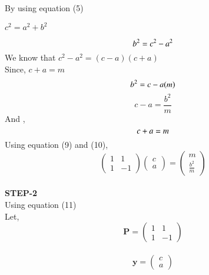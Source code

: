 \documentclass[10pt,a4paper]{report}
\let\vec\mathbf
\begin{document}
\begin{multicols}{2}
By using equation (5)
\begin{center}
    $ c^2 =a^2 + b^2 $ \vspace{2mm}
\end{center}
\begin{equation}
    b^2 = c^2- a^2 \vspace{2mm}
\end{equation}
We know that $c^2- a^2 =  (c-a) (c+a)$\vspace{2mm}\\
Since, $ c+a=m$
\begin{equation}
  b^2 = c-a (m) \vspace{2mm}
\end{equation}
\begin{equation}
 c-a = \frac{b^2}{m}
\end{equation}
And ,
\begin{equation}
 c+a = m \vspace{2mm}
\end{equation}
Using equation (9) and (10),
\begin{equation}
  \begin{pmatrix}
1 & 1\\
1 &-1
\end{pmatrix} 
\begin{pmatrix}
c\\
a
\end{pmatrix} = \begin{pmatrix}
m\\
\frac{b^2}{m}
\end{pmatrix} 
\end{equation}\vspace{2mm}\\

\textbf{STEP-2}\vspace{2mm}\\
Using equation (11) \vspace{2mm}\\
 Let,
\begin{equation}
\vec{P} =\begin{pmatrix}
1 & 1\\
1 &-1
\end{pmatrix} 
\end{equation} \\ \vspace{2mm}
\begin{equation}
  \vec{y} =\begin{pmatrix}
c \\
a
\end{pmatrix} 
\end{equation}  \vspace{2mm}


\end{multicols}
\end{document}
